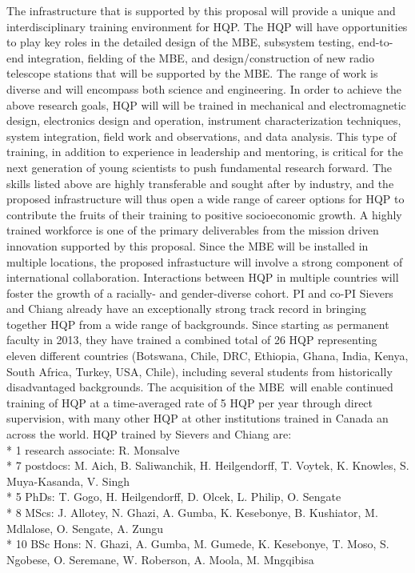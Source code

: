 \documentclass[letterpaper,11pt,preprint]{aastex}
\newcommand{\mbe}{{\rm MBE}}
\begin{document}
The infrastructure that is supported by this proposal will provide a
unique and interdisciplinary training environment for HQP.  The HQP
will have opportunities to play key roles in the detailed design of
the MBE, subsystem testing, end-to-end integration, fielding of the
MBE, and design/construction of new radio telescope stations that will
be supported by the MBE.  The range of work is diverse and will
encompass both science and engineering.  In order to achieve the above
research goals, HQP will will be trained in mechanical and
electromagnetic design, electronics design and operation, instrument
characterization techniques, system integration, field work and
observations, and data analysis.  This type of training, in addition
to experience in leadership and mentoring, is critical for the next
generation of young scientists to push fundamental research forward.
The skills listed above are highly transferable and sought after by
industry, and the proposed infrastructure will thus open a wide range
of career options for HQP to contribute the fruits of their training
to positive socioeconomic growth.  A highly trained workforce is one
of the primary deliverables from the mission driven innovation
supported by this proposal.  
Since the MBE will be installed in multiple locations, the proposed
infrastucture will involve a strong component of international
collaboration.  Interactions between HQP in multiple countries will
foster the growth of a racially- and gender-diverse cohort.  PI and
co-PI Sievers and Chiang already have an exceptionally strong track
record in bringing together HQP from a wide range of backgrounds.
Since starting as permanent faculty in 2013, they have trained a combined total of 26 HQP representing eleven
different countries (Botswana, Chile, DRC, Ethiopia, Ghana, India, Kenya, South
Africa, Turkey, USA, Chile), including several students from historically
disadvantaged backgrounds.  The acquisition of the \mbe\ will enable
continued training of HQP at a time-averaged rate of 5 HQP per year
through direct supervision, with many other HQP at other institutions
trained in Canada an across the world.  HQP trained by Sievers and
Chiang are: \\
* 1 research associate: R. Monsalve \\
* 7 postdocs: M. Aich, B. Saliwanchik, H. Heilgendorff, T. Voytek, K. Knowles, S. Muya-Kasanda, V. Singh \\
* 5 PhDs: T. Gogo, H. Heilgendorff, D. Olcek, L. Philip, O. Sengate \\
* 8 MScs: J. Allotey, N. Ghazi, A. Gumba, K. Kesebonye, B. Kushiator, M. Mdlalose, O. Sengate, A. Zungu \\
* 10 BSc Hons: N. Ghazi, A. Gumba, M. Gumede, K. Kesebonye, T. Moso, S. Ngobese, O. Seremane, W. Roberson, A. Moola, M. Mngqibisa \\
\end{document}
